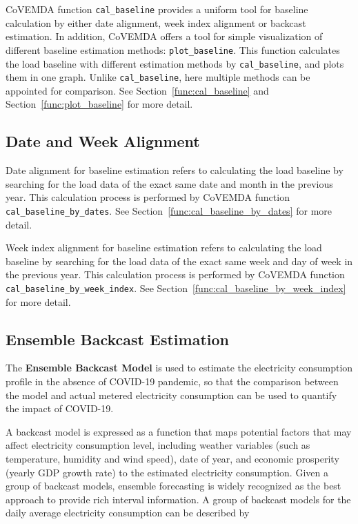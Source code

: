 \documentclass[10pt]{article}
\newcommand{\covemda}{CoVEMDA}
\numberwithin{equation}{section}
\numberwithin{table}{section}
\numberwithin{figure}{section}
\begin{document}
\covemda{} function \verb!cal_baseline! provides a uniform tool for baseline calculation by either date alignment, week index alignment or backcast estimation. In addition, \covemda{} offers a tool for simple visualization of different baseline estimation methods: \verb!plot_baseline!. This function calculates the load baseline with different estimation methods by \verb!cal_baseline!, and plots them in one graph. Unlike \verb!cal_baseline!, here multiple methods can be appointed for comparison. See Section~\ref{func:cal_baseline} and Section~\ref{func:plot_baseline} for more detail.



\subsection{Date and Week Alignment}

Date alignment for baseline estimation refers to calculating the load baseline by searching for the load data of the exact same date and month in the previous year. This calculation process is performed by \covemda{} function \verb!cal_baseline_by_dates!. See Section~\ref{func:cal_baseline_by_dates} for more detail.

Week index alignment for baseline estimation refers to calculating the load baseline by searching for the load data of the exact same week and day of week in the previous year. This calculation process is performed by \covemda{} function \verb!cal_baseline_by_week_index!. See Section~\ref{func:cal_baseline_by_week_index} for more detail.



\subsection{Ensemble Backcast Estimation}
The \textbf{Ensemble Backcast Model} is used to estimate the electricity consumption profile in the absence of COVID-19 pandemic, so that the comparison between the model and actual metered electricity consumption can be used to quantify the impact of COVID-19.

A backcast model is expressed as a function that maps potential factors that may affect electricity consumption level, including weather variables (such as temperature, humidity and wind speed), date of year, and economic prosperity (yearly GDP growth rate) to the estimated electricity consumption. Given a group of backcast models, ensemble forecasting is widely recognized as the best approach to provide rich interval information\cite{gosink2013characterizing}. A group of backcast models for the daily average electricity consumption can be described by
\end{document}
